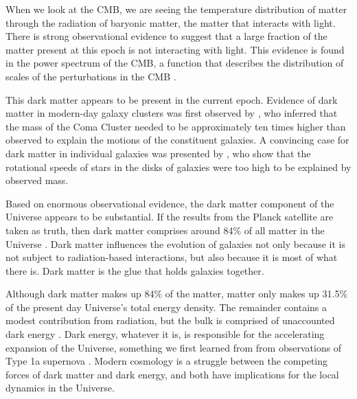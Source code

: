 When we look at the CMB, we are seeing the temperature distribution of matter through the radiation of baryonic matter, the matter that interacts with light. There is strong observational evidence to suggest that a large fraction of the matter present at this epoch is not interacting with light. This evidence is found in the power spectrum of the CMB, a function that describes the distribution of scales of the perturbations in the CMB \citep{transfer_fn}. 

This dark matter appears to be present in the current epoch. Evidence of dark matter in modern-day galaxy clusters was first observed by \citet{zwicky_1933}, who inferred that the mass of the Coma Cluster needed to be approximately ten times higher than observed to explain the motions of the constituent galaxies. A convincing case for dark matter in individual galaxies was presented by \citet{rubin_1980}, who show that the rotational speeds of stars in the disks of galaxies were too high to be explained by observed mass.

Based on enormous observational evidence, the dark matter component of the Universe appears to be substantial. If the results from the Planck satellite are taken as truth, then dark matter comprises around 84\% of all matter in the Universe \citep{planck_2018}. Dark matter influences the evolution of galaxies not only because it is not subject to radiation-based interactions, but also because it is most of what there is. Dark matter is the glue that holds galaxies together.  

Although dark matter makes up 84\% of the matter, matter only makes up 31.5\% of the present day Universe's total energy density. The remainder contains a modest contribution from radiation, but the bulk is comprised of unaccounted dark energy \citep{kolb_turner,dodelson, BT}. Dark energy, whatever it is, is responsible for the accelerating expansion of the Universe, something we first learned from from observations of Type 1a supernova \citep{reiss_1998,perlmutter_1999}. Modern cosmology is a struggle between the competing forces of dark matter and dark energy, and both have implications for the local dynamics in the Universe.

